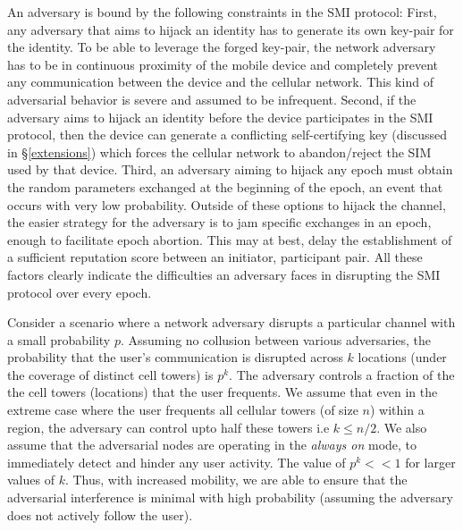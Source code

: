 \documentclass[letterpaper,twocolumn]{sig-alternate}
\begin{document}
An adversary is bound by the following constraints in the SMI protocol: First, any adversary that aims to hijack an identity has to generate its own key-pair for the identity. To be able to leverage the forged key-pair, the network adversary has to be in continuous proximity of the mobile device and completely prevent any communication between the device and the cellular network. This kind of adversarial behavior is severe and assumed to be infrequent. Second, if the adversary aims to hijack an identity before the device participates in the SMI protocol, then the device can generate a conflicting self-certifying key (discussed in \S \ref{extensions}) which forces the cellular network to abandon/reject the SIM used by that device. Third, an adversary aiming to hijack any epoch must obtain the random parameters exchanged at the beginning of the epoch, an event that occurs with very low probability. Outside of these options to hijack the channel, the easier strategy for the adversary is to jam specific exchanges in an epoch, enough to facilitate epoch abortion. This may at best, delay the establishment of a sufficient reputation score between an initiator, participant pair. All these factors clearly indicate the difficulties an adversary faces in disrupting the SMI protocol over every epoch. 

\vspace{1mm}
Consider a scenario where a network adversary disrupts a particular channel with a small probability $p$. Assuming no collusion between various adversaries, the probability that the user's communication is disrupted across $k$ locations (under the coverage of distinct cell towers) is $p^k$. The adversary controls a fraction of the the cell towers (locations) that the user frequents. We assume that even in the extreme case where the user frequents all cellular towers (of size $n$) within a region, the adversary can control upto half these towers i.e $k \leq n/2$. We also assume that the adversarial nodes are operating in the {\em always on} mode, to immediately detect and hinder any user activity. The value of $p^k << 1$ for larger values of $k$. Thus, with increased mobility, we are able to ensure that the adversarial interference is minimal with high probability (assuming the adversary does not actively follow the user). 
\end{document}
